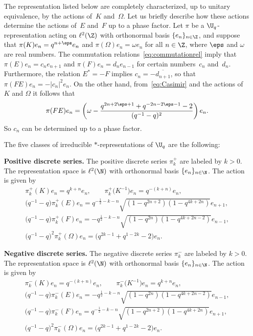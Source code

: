 The representation listed below are completely characterized, up to unitary equivalence, by the actions of~$K$ and~$\Omega$. Let us brief\/ly describe how these actions determine the actions of~$E$ and~$F$ up to a phase factor. Let $\pi$ be a $\U_q$-representation acting on $\ell^2(\Z)$ with orthonormal basis $\{e_n\}_{n \in \Z}$, and suppose that $\pi(K)e_n=q^{n+\eps}e_n$ and $\pi(\Omega)e_n = \omega e_n$ for all $n \in \Z$, where $\eps$ and $\omega$ are real numbers. The commutation relations~\eqref{eq:commutationrel} imply that $\pi(E)e_n = c_n e_{n+1}$ and $\pi(F) e_n = d_n e_{n-1}$ for certain numbers~$c_n$ and~$d_n$. Furthermore, the relation $E^*=-F$ implies $c_n=-\overline{d_{n+1}}$, so that $\pi(FE) e_n = - |c_n|^2 e_n$. On the other hand, from~\eqref{eq:Casimir} and the actions of $K$ and $\Omega$ it follows that
\[
\pi(FE) e_n = \left(\omega-\frac{q^{2n+2\eps+1}+q^{-2n-2\eps-1}-2}{(q^{-1}-q)^2}\right)e_n.
\]
So $c_n$ can be determined up to a phase factor.

The f\/ive classes of irreducible $*$-representations of $\U_q$ are the following:

\textbf{Positive discrete series.} The positive discrete series $\pi^+_k$
are labeled by $k>0$. The representation space is $\ell^2(\N)$
with orthonormal basis $\{e_n\}_{n \in \N }$. The action is
given by
\begin{gather}
\pi^+_k(K)  e_n  = q^{k+n}  e_n, \qquad \pi^+_k\big(K^{-1}\big)  e_n =q^{-(k+n)} e_n, \nonumber \\
\big(q^{-1}-q\big)\pi^+_k(E)  e_n  = q^{-\frac12-k-n} \sqrt{(1-q^{2n+2})(1-q^{4k+2n})}  e_{n+1},  \nonumber\\
\big(q^{-1}-q\big)\pi^+_k(F)  e_n  = -q^{\frac12-k-n}
\sqrt{(1-q^{2n})(1-q^{4k+2n-2})}  e_{n-1},\nonumber\\
\big(q^{-1}-q\big)^2 \pi^+_k(\Omega)  e_n  = \big(q^{2k-1}+q^{1-2k}-2\big)  e_n.\label{eq:pos}
\end{gather}

\textbf{Negative discrete series.} The negative discrete series
$\pi^-_k$ are labeled by $k>0$. The representation space is
$\ell^2(\N)$ with orthonormal basis $\{e_n\}_{n \in \N}$. The action is given by
\begin{gather}
\pi^-_k(K) e_n = q^{-(k+n)} e_n, \qquad \pi^-_k\big(K^{-1}\big) e_n =q^{k+n} e_n,
 \nonumber\\
 \big(q^{-1}-q\big)\pi^-_k(E)  e_n  = -q^{\frac12-k-n}
\sqrt{(1-q^{2n})(1-q^{4k+2n-2})}  e_{n-1},
\nonumber\\
\big(q^{-1}-q\big)\pi^-_k(F) e_n = q^{-\frac12-k-n}
\sqrt{(1-q^{2n+2})(1-q^{4k+2n})} e_{n+1}, \nonumber\\
\big(q^{-1}-q\big)^2 \pi^-_k(\Omega) e_n = \big(q^{2k-1}+q^{1-2k}-2\big) e_n.\label{eq:neg}
\end{gather}

